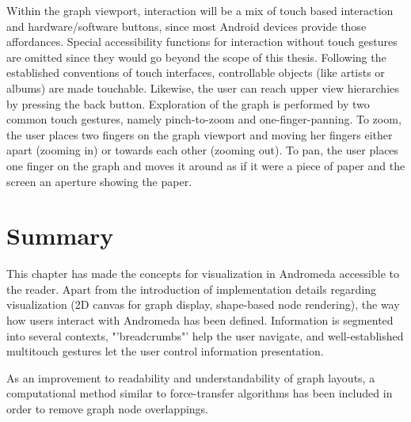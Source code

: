 Within the graph viewport, interaction will be a mix of touch based interaction and hardware/software buttons, since most Android devices provide those affordances. Special accessibility functions for interaction without touch gestures are omitted since they would go beyond the scope of this thesis.
Following the established conventions of touch interfaces, controllable objects (like artists or albums) are made touchable. Likewise, the user can reach upper view hierarchies by pressing the back button.
Exploration of the graph is performed by two common touch gestures, namely pinch-to-zoom and one-finger-panning. To zoom, the user places two fingers on the graph viewport and moving her fingers either apart (zooming in) or towards each other (zooming out). To pan, the user places one finger on the graph and moves it around as if it were a piece of paper and the screen an aperture showing the paper.

\section{Summary}

This chapter has made the concepts for visualization in Andromeda accessible to the reader. Apart from the introduction of implementation details regarding visualization (2D canvas for graph display, shape-based node rendering), the way how users interact with Andromeda has been defined. Information is segmented into several contexts, "'breadcrumbs"' help the user navigate, and well-established multitouch gestures let the user control information presentation. 

As an improvement to readability and understandability of graph layouts, a computational method similar to force-transfer algorithms has been included in order to remove graph node overlappings.